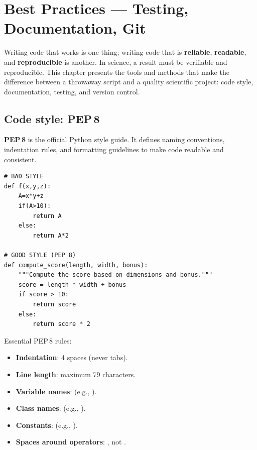 \chapter{Best Practices --- Testing, Documentation, Git}
\label{ch:best_practices}

\begin{intuition}
Writing code that works is one thing; writing code that is \textbf{reliable},
\textbf{readable}, and \textbf{reproducible} is another. In science, a result
must be verifiable and reproducible. This chapter presents the tools and
methods that make the difference between a throwaway script and a quality
scientific project: code style, documentation, testing, and version control.
\end{intuition}

\section{Code style: PEP\,8}

\begin{definition}[PEP\,8]
\textbf{PEP\,8} is the official Python style guide. It defines naming conventions,
indentation rules, and formatting guidelines to make code readable and
consistent.
\end{definition}

\begin{codeblock}[title=\textbf{Python}]
\begin{verbatim}
# BAD STYLE
def f(x,y,z):
    A=x*y+z
    if(A>10):
        return A
    else:
        return A*2

# GOOD STYLE (PEP 8)
def compute_score(length, width, bonus):
    """Compute the score based on dimensions and bonus."""
    score = length * width + bonus
    if score > 10:
        return score
    else:
        return score * 2
\end{verbatim}
\end{codeblock}

\begin{bestpractice}
Essential PEP\,8 rules:
\begin{itemize}
  \item \textbf{Indentation}: 4 spaces (never tabs).
  \item \textbf{Line length}: maximum 79 characters.
  \item \textbf{Variable names}:  (e.g., ).
  \item \textbf{Class names}:  (e.g., ).
  \item \textbf{Constants}:  (e.g., ).
  \item \textbf{Spaces around operators}: , not .
\end{itemize}
\end{bestpractice}

